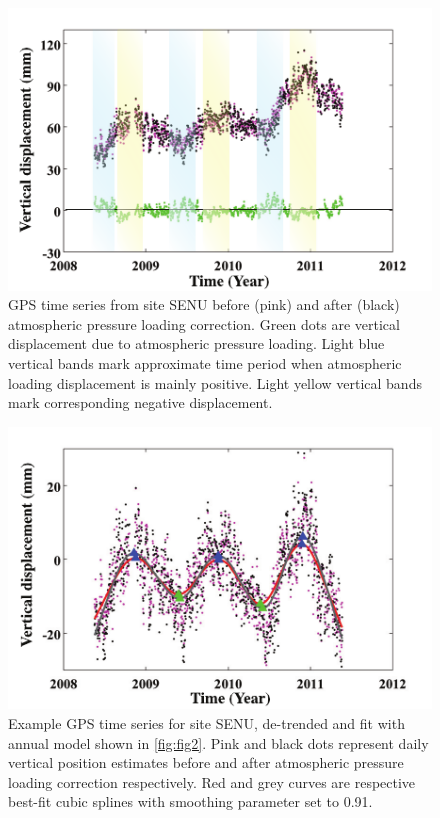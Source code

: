 \clearpage
\begin{figure}
	\centering
	\includegraphics{figs_chpt3/2012GC004432-pA01.pdf}
	\caption[GPS time series from site SENU before (pink) and after (black) atmospheric pressure loading correction.]{GPS time series from site SENU before (pink) and after (black) atmospheric pressure loading correction. Green dots are vertical displacement due to atmospheric pressure loading. Light blue vertical bands mark approximate time period when atmospheric loading displacement is mainly positive. Light yellow vertical bands mark corresponding negative displacement.}
	\label{fig:SI3_fig1}
\end{figure}

\clearpage
\begin{figure}
	\centering
	\includegraphics{figs_chpt3/2012GC004432-pA02.pdf}
	\caption[Example GPS time series for site SENU, de-trended and fit with annual model shown in Figure \ref{fig:fig2}.]{Example GPS time series for site SENU, de-trended and fit with annual model shown in \ref{fig:fig2}. Pink and black dots represent daily vertical position estimates before and after atmospheric pressure loading correction respectively. Red and grey curves are respective best-fit cubic splines with smoothing parameter set to 0.91.}
	\label{fig:SI3_fig2}
\end{figure}

